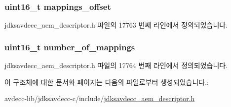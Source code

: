 \subsubsection[{\texorpdfstring{mappings\+\_\+offset}{mappings_offset}}]{\setlength{\rightskip}{0pt plus 5cm}uint16\+\_\+t mappings\+\_\+offset}\hypertarget{structjdksavdecc__descriptor__audio__map_ac91a41273e32c7bf86ca390838721642}{}\label{structjdksavdecc__descriptor__audio__map_ac91a41273e32c7bf86ca390838721642}


jdksavdecc\+\_\+aem\+\_\+descriptor.\+h 파일의 17763 번째 라인에서 정의되었습니다.

\subsubsection[{\texorpdfstring{number\+\_\+of\+\_\+mappings}{number_of_mappings}}]{\setlength{\rightskip}{0pt plus 5cm}uint16\+\_\+t number\+\_\+of\+\_\+mappings}\hypertarget{structjdksavdecc__descriptor__audio__map_ac7db472c5622ef473d5d0a5c416d5531}{}\label{structjdksavdecc__descriptor__audio__map_ac7db472c5622ef473d5d0a5c416d5531}


jdksavdecc\+\_\+aem\+\_\+descriptor.\+h 파일의 17764 번째 라인에서 정의되었습니다.



이 구조체에 대한 문서화 페이지는 다음의 파일로부터 생성되었습니다.\+:\begin{DoxyCompactItemize}
\item 
avdecc-\/lib/jdksavdecc-\/c/include/\hyperlink{jdksavdecc__aem__descriptor_8h}{jdksavdecc\+\_\+aem\+\_\+descriptor.\+h}\end{DoxyCompactItemize}
